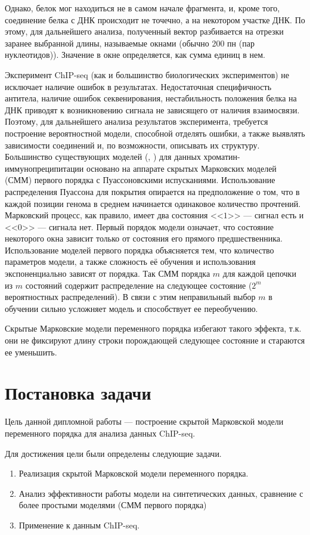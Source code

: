 \documentclass{matmex-diploma-custom}
\begin{document}
Однако, белок мог находиться не в самом начале фрагмента, и, кроме того, соединение белка с ДНК происходит не точечно, а на некотором участке ДНК.
По этому, для дальнейшего анализа, полученный вектор разбивается на отрезки заранее выбранной длины, называемые окнами (обычно 200 пн (пар нуклеотидов)). Значение в окне определяется, как сумма единиц в нем. 

Эксперимент ChIP-seq (как и большинство биологических
экспериментов) не исключает наличие ошибок в результатах. Недостаточная специфичность антитела, наличие ошибок секвенирования, нестабильность положения белка на ДНК приводят к возникновению сигнала не
зависящего от наличия взаимосвязи.
Поэтому, для дальнейшего анализа результатов эксперимента, требуется построение вероятностной модели, способной отделять ошибки, а также 
выявлять зависимости соединений и, по возможности, описывать их структуру.
Большинство существующих моделей (\cite{Zhang2008}, \cite{Spyrou2009}) для данных
хроматин-иммунопреципитации основано на аппарате скрытых Марковских моделей (СММ) \cite{Rabiner1989}
первого порядка с Пуассоновскими испусканиями. Использование распределения
Пуассона для покрытия опирается на предположение о том, что в каждой
позиции генома в среднем начинается одинаковое количество прочтений.
Марковский процесс, как правило, имеет два состояния <<$1$>> --- сигнал есть и <<$0$>> --- сигнала нет. Первый порядок модели означает, что состояние некоторого окна зависит только от состояния его прямого предшественника.
Использование моделей первого порядка объясняется тем, что количество параметров
модели, а также сложность её обучения и использования экспоненциально зависят от
порядка. Так СММ порядка $ m $ для каждой цепочки из $ m $ состояний содержит распределение на следующее состояние ($ 2^m $ вероятностных распределений). В связи с этим неправильный выбор $ m $ в обучении сильно усложняет модель и способствует ее переобучению. 

Скрытые Марковские модели переменного порядка избегают такого эффекта, т.к. они не фиксируют длину строки порождающей следующее состояние и стараются ее уменьшить.

\section{Постановка задачи}
Цель данной дипломной работы --- построение скрытой Марковской модели переменного
порядка для анализа данных ChIP-seq.

Для достижения цели были определены следующие задачи.
\begin{enumerate}
\item
Реализация скрытой Марковской модели
переменного порядка.
\item
Анализ эффективности работы модели на синтетических
данных, сравнение с более простыми моделями (СММ
первого порядка)
\item
Применение к данным ChIP-seq.
\end{enumerate}
\end{document}
